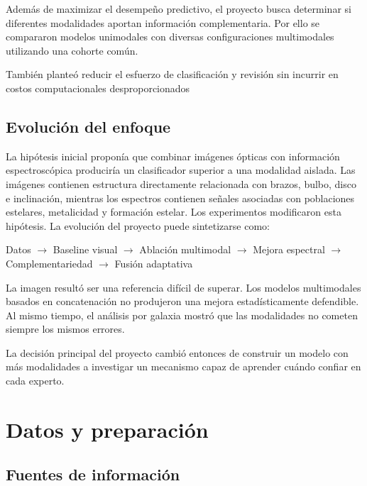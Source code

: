 \documentclass[letterpaper,11pt]{article}
\begin{document}
Además de maximizar el desempeño predictivo, el proyecto busca determinar si diferentes modalidades aportan información complementaria. Por ello se compararon modelos unimodales con diversas configuraciones multimodales utilizando una cohorte común. 

También planteó reducir el esfuerzo de clasificación y revisión sin incurrir en costos computacionales desproporcionados \parencite{carrenocorrea2026}

\subsection{Evolución del enfoque} 

La hipótesis inicial proponía que combinar imágenes ópticas con información espectroscópica produciría un clasificador superior a una modalidad aislada. Las imágenes contienen estructura directamente relacionada con brazos, bulbo, disco e inclinación, mientras los espectros contienen señales asociadas con poblaciones estelares, metalicidad y formación estelar. Los experimentos modificaron esta hipótesis. La evolución del proyecto puede sintetizarse como:

\begin{center} 
  Datos $\rightarrow$ 
  Baseline visual $\rightarrow$ 
  Ablación multimodal $\rightarrow$ 
  Mejora espectral $\rightarrow$ 
  Complementariedad $\rightarrow$ 
  Fusión adaptativa 
\end{center}

La imagen resultó ser una referencia difícil de superar. Los modelos multimodales basados en concatenación no produjeron una mejora estadísticamente defendible. Al mismo tiempo, el análisis por galaxia mostró que las modalidades no cometen siempre los mismos errores. 

La decisión principal del proyecto cambió entonces de construir un modelo con más modalidades a investigar un mecanismo capaz de aprender cuándo confiar en cada experto.

\section{Datos y preparación} 
\subsection{Fuentes de información}
\end{document}
